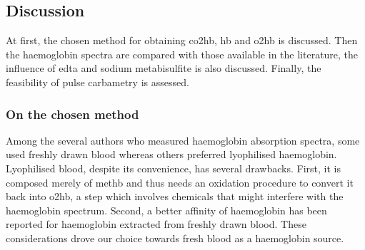\subsection{Discussion}

At first, the chosen method for obtaining \gls{co2hb}, \gls{hb} and \gls{o2hb} is discussed. Then the haemoglobin spectra are compared with those available in the literature, the influence of \gls{edta} and sodium metabisulfite is also discussed. Finally, the feasibility of pulse carbametry is assessed.

\subsubsection{On the chosen method}

Among the several authors who measured haemoglobin absorption spectra, some used freshly drawn blood\cite{horecker1943, barlow1962, assendelft1970, mook1979, wray1988, mendelson1989, cope1991, zijlstra1991, zijlstra2000, mieczkowska2011} whereas others preferred lyophilised haemoglobin\cite{drabkin1935, dalziel1957, robles2010}. Lyophilised blood, despite its convenience, has several drawbacks. First, it is composed merely of \gls{methb}\cite{sigma7379, mieczkowska2011} and thus needs an oxidation procedure to convert it back into \gls{o2hb}, a step which involves chemicals that might interfere with the haemoglobin spectrum. Second, a better affinity of haemoglobin has been reported for haemoglobin extracted from freshly drawn blood\cite{horecker1943, mieczkowska2011}. These considerations drove our choice towards fresh blood as a haemoglobin source.

